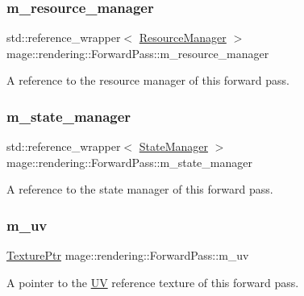 \subsubsection{\texorpdfstring{m\+\_\+resource\+\_\+manager}{m\_resource\_manager}}
{\footnotesize\ttfamily std\+::reference\+\_\+wrapper$<$ \hyperlink{classmage_1_1rendering_1_1_resource_manager}{Resource\+Manager} $>$ mage\+::rendering\+::\+Forward\+Pass\+::m\+\_\+resource\+\_\+manager\hspace{0.3cm}{\ttfamily [private]}}

A reference to the resource manager of this forward pass. \hypertarget{classmage_1_1rendering_1_1_forward_pass_a01d72a7d6be3f98806df7780c94916ff}{}\label{classmage_1_1rendering_1_1_forward_pass_a01d72a7d6be3f98806df7780c94916ff} 
\subsubsection{\texorpdfstring{m\+\_\+state\+\_\+manager}{m\_state\_manager}}
{\footnotesize\ttfamily std\+::reference\+\_\+wrapper$<$ \hyperlink{classmage_1_1rendering_1_1_state_manager}{State\+Manager} $>$ mage\+::rendering\+::\+Forward\+Pass\+::m\+\_\+state\+\_\+manager\hspace{0.3cm}{\ttfamily [private]}}

A reference to the state manager of this forward pass. \hypertarget{classmage_1_1rendering_1_1_forward_pass_ab2fcc28c086c7ddb6e13bfd5f9d994b9}{}\label{classmage_1_1rendering_1_1_forward_pass_ab2fcc28c086c7ddb6e13bfd5f9d994b9} 
\subsubsection{\texorpdfstring{m\+\_\+uv}{m\_uv}}
{\footnotesize\ttfamily \hyperlink{namespacemage_1_1rendering_a6f3ae54f825328465b0cdde0f0de4a36}{Texture\+Ptr} mage\+::rendering\+::\+Forward\+Pass\+::m\+\_\+uv\hspace{0.3cm}{\ttfamily [private]}}

A pointer to the \hyperlink{structmage_1_1_u_v}{UV} reference texture of this forward pass. \hypertarget{classmage_1_1rendering_1_1_forward_pass_ae1483b1f37cd65efdf6059bcc7d1dd09}{}\label{classmage_1_1rendering_1_1_forward_pass_ae1483b1f37cd65efdf6059bcc7d1dd09} 

